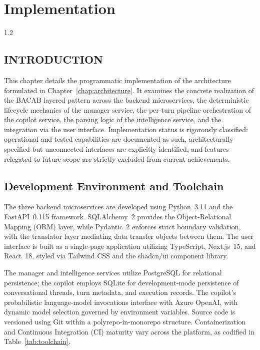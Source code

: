 \chapter{Implementation}\label{chap:implementation}
\begin{spacing}{1.2}
\minitoc
\thispagestyle{MyStyle}
\end{spacing}
\newpage

\section*{INTRODUCTION}
This chapter details the programmatic implementation of the architecture formulated in Chapter~\ref{chap:architecture}. It examines the concrete realization of the BACAB layered pattern across the backend microservices, the deterministic lifecycle mechanics of the manager service, the per-turn pipeline orchestration of the copilot service, the parsing logic of the intelligence service, and the integration via the user interface. Implementation status is rigorously classified: operational and tested capabilities are documented as such, architecturally specified but unconnected interfaces are explicitly identified, and features relegated to future scope are strictly excluded from current achievements.

\section{Development Environment and Toolchain}\label{sec:impl_env}
The three backend microservices are developed using Python~3.11 and the FastAPI~0.115 framework. SQLAlchemy~2 provides the Object-Relational Mapping (ORM) layer, while Pydantic~2 enforces strict boundary validation, with the translator layer mediating data transfer objects between them. The user interface is built as a single-page application utilizing TypeScript, Next.js~15, and React~18, styled via Tailwind CSS and the shadcn/ui component library.

The manager and intelligence services utilize PostgreSQL for relational persistence; the copilot employs SQLite for development-mode persistence of conversational threads, turn metadata, and execution records. The copilot's probabilistic language-model invocations interface with Azure OpenAI, with dynamic model selection governed by environment variables. Source code is versioned using Git within a polyrepo-in-monorepo structure. Containerization and Continuous Integration (CI) maturity vary across the platform, as codified in Table~\ref{tab:toolchain}.

